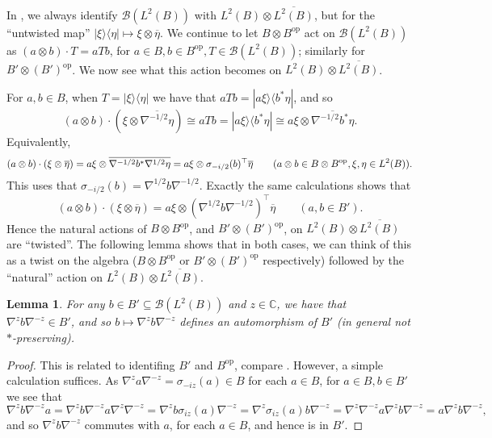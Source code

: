\documentclass[a4paper,11pt]{article}
\theoremstyle{plain}
\newtheorem{lemma}[proposition]{Lemma}
\theoremstyle{remark}
\newcommand{\mc}[1]{\mathcal{#1}}
\newcommand{\op}{{\operatorname{op}}}
\begin{document}
In \cite{daws_quantum_graphs}, we always identify $\mc B(L^2(B))$ with $L^2(B) \otimes \overline{L^2(B)}$, but for the ``untwisted map'' $|\xi\rangle\langle\eta| \mapsto \xi\otimes\overline{\eta}$.  We continue to let $B\otimes B^\op$ act on $\mc B(L^2(B))$ as $(a\otimes b) \cdot T = aTb$, for $a\in B, b\in B^\op, T\in\mc B(L^2(B))$; similarly for $B'\otimes (B')^\op$.  We now see what this action becomes on $L^2(B) \otimes \overline{L^2(B)}$.

For $a,b\in B$, when $T = |\xi\rangle\langle\eta|$ we have that $aTb = |a\xi\rangle\langle b^*\eta|$, and so
\[ (a\otimes b) \cdot (\xi\otimes \overline{\nabla^{-1/2}\eta})
 \cong aTb = |a\xi\rangle\langle b^*\eta|
 \cong a\xi\otimes \overline{\nabla^{-1/2}b^*\eta}. \]
Equivalently,
\begin{equation} \notag%
(a\otimes b) \cdot (\xi\otimes \overline{\eta})
= a\xi\otimes \overline{\nabla^{-1/2}b^*\nabla^{1/2}\eta}
= a\xi \otimes \sigma_{-i/2}(b)^\top \overline{ \eta }
\qquad (a\otimes b\in B\otimes B^\op, \xi,\eta\in L^2(B)).
\end{equation}
This uses that $\sigma_{-i/2}(b) = \nabla^{1/2} b \nabla^{-1/2}$.  Exactly the same calculations shows that 
\[ (a\otimes b) \cdot (\xi\otimes\overline\eta) = a\xi \otimes (\nabla^{1/2} b \nabla^{-1/2})^\top\overline\eta \qquad (a,b\in B'). \]
Hence the natural actions of $B\otimes B^\op$, and $B'\otimes (B')^\op$, on $L^2(B) \otimes \overline{L^2(B)}$ are ``twisted''.  The following lemma shows that in both cases, we can think of this as a twist on the algebra ($B\otimes B^\op$ or $B'\otimes (B')^\op$ respectively) followed by the ``natural'' action on $L^2(B) \otimes \overline{L^2(B)}$.

\begin{lemma}\label{lem:mod_aut_bcomm}
For any $b\in B' \subseteq \mc B(L^2(B))$ and $z\in\mathbb C$, we have that $\nabla^z b \nabla^{-z} \in B'$, and so $b\mapsto \nabla^z b \nabla^{-z}$ defines an automorphism of $B'$ (in general not $*$-preserving).
\end{lemma}
\begin{proof}
This is related to identifing $B'$ and $B^\op$, compare \cite[Lemma~5.32]{daws_quantum_graphs}.  However, a simple calculation suffices.  As $\nabla^z a \nabla^{-z} = \sigma_{-iz}(a)\in B$ for each $a\in B$, for $a\in B, b\in B'$ we see that
\[ \nabla^z b \nabla^{-z} a = \nabla^z b \nabla^{-z} a \nabla^z \nabla^{-z}
= \nabla^z b \sigma_{iz}(a) \nabla^{-z}
= \nabla^z \sigma_{iz}(a) b \nabla^{-z}
= \nabla^z \nabla^{-z} a \nabla^z b \nabla^{-z}
= a \nabla^z b \nabla^{-z}, \]
and so $\nabla^z b \nabla^{-z}$ commutes with $a$, for each $a\in B$, and hence is in $B'$.
\end{proof}
\end{document}
